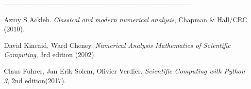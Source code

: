 \documentclass[12pt,a4paper]{article}
\begin{document}
\begin{center}
 -----------------------------------------------------------------------------------
\end{center}
\begin{multicols}{2}
\begin{list}{}{\setlength{\topsep}{0mm}\setlength{\itemsep}{0mm}%
\setlength{\parsep}{0mm}\setlength{\leftmargin}{4mm}}
%
\small
\item[1.] Azmy S Ackleh. \textit{Classical and modern numerical analysis}, Chapman \& Hall/CRC (2010).
\item[2.] David Kincaid, Ward Cheney. \textit{Numerical Analysis Mathematics of Scientific Computing}, 3rd edition (2002).
\item[3.] Claus Fuhrer, Jan Erik Solem, Olivier Verdier. \textit{Scientific Computing with Python 3}, 2nd edition(2017).
%
\end{list}
\end{multicols}
\end{document}
